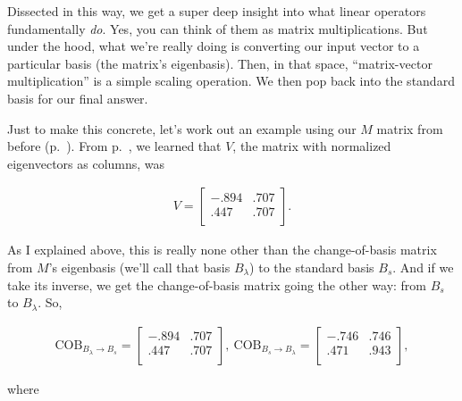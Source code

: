 Dissected in this way, we get a super deep insight into what linear operators
fundamentally \textit{do}. Yes, you can think of them as matrix
multiplications. But under the hood, what we're really doing is converting our
input vector to a particular basis (the matrix's eigenbasis). Then, in that
space, ``matrix-vector multiplication'' is a simple scaling operation. We then
pop back into the standard basis for our final answer.

\smallskip

Just to make this concrete, let's work out an example using our $M$ matrix from
before (p.~\pageref{mmatrix}). From p.~\pageref{mmatrixST}, we learned that
$V$, the matrix with normalized eigenvectors as columns, was

\vspace{-.15in}
\begin{align*}
V = \begin{bmatrix}
-.894 & .707 \\
.447 & .707 \\
\end{bmatrix}.
\end{align*}
\vspace{-.15in}

As I explained above, this is really none other than the change-of-basis matrix
from $M$'s eigenbasis (we'll call that basis $B_\lambda$) to the standard basis
$B_s$. And if we take its inverse, we get the change-of-basis matrix going the
other way: from $B_s$ to $B_\lambda$. So,

\vspace{-.15in}
\begin{align*}
\textrm{COB}_{B_\lambda \rightarrow B_s} =
\begin{bmatrix}
-.894 & .707 \\
.447 & .707 \\
\end{bmatrix},\ 
\textrm{COB}_{B_s \rightarrow B_\lambda} =
\begin{bmatrix}
-.746 & .746 \\
.471 & .943 \\
\end{bmatrix}, 
\end{align*}
\vspace{-.15in}

where

